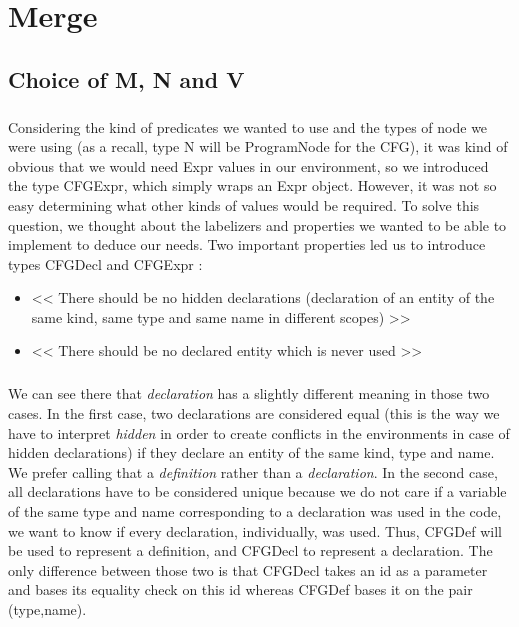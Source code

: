 \documentclass{report}
\begin{document}
\chapter{Merge}

\section{Choice of M, N and V}

\paragraph{}
\hspace{4mm}Considering the kind of predicates we wanted to use and the types of node we were using (as a recall, type N will be ProgramNode for the CFG), it was kind
of obvious that we would need Expr values in our environment, so we introduced the type CFGExpr, which simply wraps an Expr object. However, it was not so easy determining what other kinds
of values would be required. To solve this question, we thought about the labelizers and properties we wanted to be able to implement to deduce our needs. 
Two important properties led us to introduce types CFGDecl and CFGExpr :

\vspace{1.5mm}
\begin{itemize}
\item << There should be no hidden declarations  (declaration of an entity of the same kind, same type and same name in different scopes) >>\vspace{1mm}
\item << There should be no declared entity which is never used >>\vspace{1mm}
\end{itemize}

\paragraph{}
\hspace{4mm}We can see there that \textit{declaration} has a slightly different meaning in those two cases. In the first case,
two declarations are considered equal (this is the way we have to interpret \textit{hidden} in order to create conflicts in the environments in case
of hidden declarations) if they declare an entity of the same kind, type and 
name. We prefer calling that a \textit{definition} rather than a \textit{declaration}. In the second case,
all declarations have to be considered unique because we do not care if a variable of the same type and name corresponding to a declaration was used in the code,
we want to know if every declaration, individually, was used. Thus, CFGDef will be used to represent a definition, and CFGDecl to represent a declaration.
The only difference between those two is that CFGDecl takes an id as a parameter and bases its equality check on this id whereas CFGDef bases it on the pair (type,name).
\end{document}
